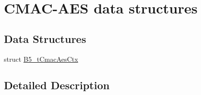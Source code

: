 \hypertarget{group__cmacaes_str}{\section{C\-M\-A\-C-\/\-A\-E\-S data structures}
\label{group__cmacaes_str}
}
\subsection*{Data Structures}
\begin{DoxyCompactItemize}
\item 
struct \hyperlink{struct_b5__t_cmac_aes_ctx}{B5\-\_\-t\-Cmac\-Aes\-Ctx}
\end{DoxyCompactItemize}


\subsection{Detailed Description}
